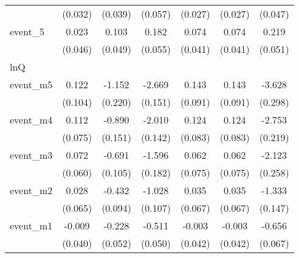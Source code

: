 {\begin{tabular}{l*{6}{c}}
            &     (0.032)         &     (0.039)         &     (0.057)         &     (0.027)         &     (0.027)         &     (0.047)         \\
[1em]
event\_5     &       0.023         &       0.103\sym{*}  &       0.182\sym{***}&       0.074         &       0.074         &       0.219\sym{***}\\
            &     (0.046)         &     (0.049)         &     (0.055)         &     (0.041)         &     (0.041)         &     (0.051)         \\
\hline
lnQ         &                     &                     &                     &                     &                     &                     \\
event\_m5    &       0.122         &      -1.152\sym{***}&      -2.669\sym{***}&       0.143         &       0.143         &      -3.628\sym{***}\\
            &     (0.104)         &     (0.220)         &     (0.151)         &     (0.091)         &     (0.091)         &     (0.298)         \\
[1em]
event\_m4    &       0.112         &      -0.890\sym{***}&      -2.010\sym{***}&       0.124         &       0.124         &      -2.753\sym{***}\\
            &     (0.075)         &     (0.151)         &     (0.142)         &     (0.083)         &     (0.083)         &     (0.219)         \\
[1em]
event\_m3    &       0.072         &      -0.691\sym{***}&      -1.596\sym{***}&       0.062         &       0.062         &      -2.123\sym{***}\\
            &     (0.060)         &     (0.105)         &     (0.182)         &     (0.075)         &     (0.075)         &     (0.258)         \\
[1em]
event\_m2    &       0.028         &      -0.432\sym{***}&      -1.028\sym{***}&       0.035         &       0.035         &      -1.333\sym{***}\\
            &     (0.065)         &     (0.094)         &     (0.107)         &     (0.067)         &     (0.067)         &     (0.147)         \\
[1em]
event\_m1    &      -0.009         &      -0.228\sym{***}&      -0.511\sym{***}&      -0.003         &      -0.003         &      -0.656\sym{***}\\
            &     (0.040)         &     (0.052)         &     (0.050)         &     (0.042)         &     (0.042)         &     (0.067)         \\

\end{tabular}}
